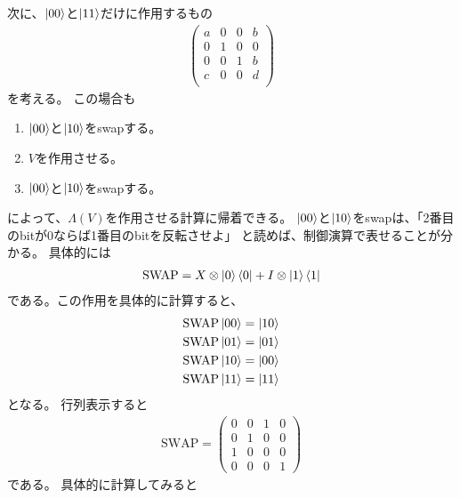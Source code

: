 \documentclass[]{ltjsarticle}
\begin{document}
次に、$\ket{00}$と$\ket{11}$だけに作用するもの
\begin{align}
    \begin{pmatrix}
        a & 0 & 0 & b \\ 
        0 & 1 & 0 & 0 \\ 
        0 & 0 & 1 & b \\ 
        c & 0 & 0 & d \\ 
    \end{pmatrix}
\end{align}
を考える。
この場合も
\begin{enumerate}
    \item $\ket{00}$と$\ket{10}$をswapする。
    \item $V$を作用させる。
    \item $\ket{00}$と$\ket{10}$をswapする。
\end{enumerate}
によって、$\Lambda(V)$を作用させる計算に帰着できる。
$\ket{00}$と$\ket{10}$をswapは、「2番目のbitが0ならば1番目のbitを反転させよ」
と読めば、制御演算で表せることが分かる。
具体的には
\begin{align}
    \text{SWAP} = X \otimes \ket{0}\bra{0} + I \otimes \ket{1}\bra{1}
\end{align}
である。この作用を具体的に計算すると、
\begin{align}
    \text{SWAP} \ket{00} &= \ket{10} \\
    \text{SWAP} \ket{01} &= \ket{01} \\
    \text{SWAP} \ket{10} &= \ket{00} \\
    \text{SWAP} \ket{11} &= \ket{11}
\end{align}
となる。
行列表示すると
\begin{align}
    \text{SWAP}
    =
    \begin{pmatrix}
        0 & 0 & 1 & 0 \\
        0 & 1 & 0 & 0 \\
        1 & 0 & 0 & 0 \\
        0 & 0 & 0 & 1
    \end{pmatrix}
\end{align}
である。
具体的に計算してみると
\end{document}
